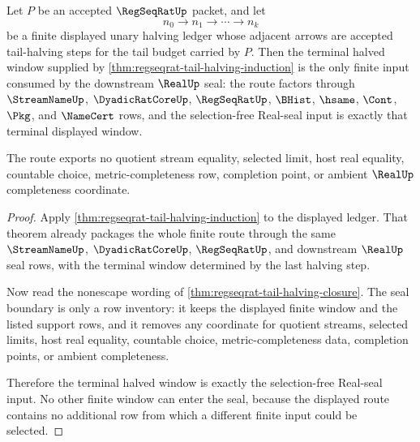 \begin{theorem}
\label{thm:regseqrat-tail-halving-terminal-real-seal}
Let $P$ be an accepted $\RegSeqRatUp$ packet, and let
$$
n_0 \to n_1 \to \cdots \to n_k
$$
be a finite displayed unary halving ledger whose adjacent arrows are accepted tail-halving steps for the tail budget carried by $P$. Then the terminal halved window supplied by \autoref{thm:regseqrat-tail-halving-induction} is the only finite input consumed by the downstream $\RealUp$ seal: the route factors through $\StreamNameUp$, $\DyadicRatCoreUp$, $\RegSeqRatUp$, $\BHist$, $\hsame$, $\Cont$, $\Pkg$, and $\NameCert$ rows, and the selection-free Real-seal input is exactly that terminal displayed window.

The route exports no quotient stream equality, selected limit, host real equality, countable choice, metric-completeness row, completion point, or ambient $\RealUp$ completeness coordinate.
\end{theorem}
\begin{proof}
Apply \autoref{thm:regseqrat-tail-halving-induction} to the displayed ledger. That theorem already packages the whole finite route through the same $\StreamNameUp$, $\DyadicRatCoreUp$, $\RegSeqRatUp$, and downstream $\RealUp$ seal rows, with the terminal window determined by the last halving step.

Now read the nonescape wording of \autoref{thm:regseqrat-tail-halving-closure}. The seal boundary is only a row inventory: it keeps the displayed finite window and the listed support rows, and it removes any coordinate for quotient streams, selected limits, host real equality, countable choice, metric-completeness data, completion points, or ambient completeness.

Therefore the terminal halved window is exactly the selection-free Real-seal input. No other finite window can enter the seal, because the displayed route contains no additional row from which a different finite input could be selected.
\end{proof}

